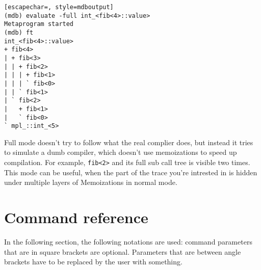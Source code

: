 \begin{minipage}{\linewidth}
\begin{lstlisting}[escapechar=, style=mdboutput]
(mdb) evaluate -full int_<fib<4>::value>
Metaprogram started
(mdb) ft
int_<fib<4>::value>
+ fib<4>
| + fib<3>
| | + fib<2>
| | | + fib<1>
| | | ` fib<0>
| | ` fib<1>
| ` fib<2>
|   + fib<1>
|   ` fib<0>
` mpl_::int_<5>
\end{lstlisting}
\end{minipage}

\lstset{
    numbers=left
}

Full mode doesn't try to follow what the real complier does, but instead it
tries to simulate a dumb compiler, which doesn't use memoizations to speed up
compilation. For example, \texttt{fib<2>} and its full sub call tree is
visible two times. This mode can be useful, when the part of the trace you're
intrested in is hidden under multiple layers of Memoizations in normal mode.

\section{Command reference}

In the following section, the following notations are used: command parameters
that are in square brackets are optional. Parameters that are between angle
brackets have to be replaced by the user with something.



